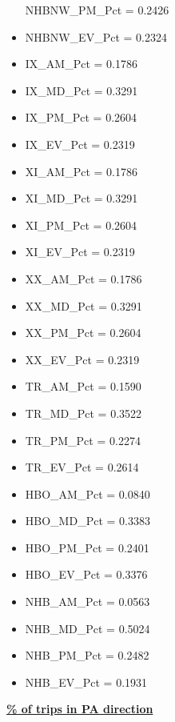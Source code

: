 \documentclass[
  letterpaper,
  DIV=11,
  numbers=noendperiod]{scrreprt}
\begin{document}
\begin{itemize}
  NHBNW\_PM\_Pct = 0.2426
\item
  NHBNW\_EV\_Pct = 0.2324
\item
  IX\_AM\_Pct = 0.1786
\item
  IX\_MD\_Pct = 0.3291
\item
  IX\_PM\_Pct = 0.2604
\item
  IX\_EV\_Pct = 0.2319
\item
  XI\_AM\_Pct = 0.1786
\item
  XI\_MD\_Pct = 0.3291
\item
  XI\_PM\_Pct = 0.2604
\item
  XI\_EV\_Pct = 0.2319
\item
  XX\_AM\_Pct = 0.1786
\item
  XX\_MD\_Pct = 0.3291
\item
  XX\_PM\_Pct = 0.2604
\item
  XX\_EV\_Pct = 0.2319
\item
  TR\_AM\_Pct = 0.1590
\item
  TR\_MD\_Pct = 0.3522
\item
  TR\_PM\_Pct = 0.2274
\item
  TR\_EV\_Pct = 0.2614\\
\item
  HBO\_AM\_Pct = 0.0840
\item
  HBO\_MD\_Pct = 0.3383
\item
  HBO\_PM\_Pct = 0.2401
\item
  HBO\_EV\_Pct = 0.3376
\item
  NHB\_AM\_Pct = 0.0563
\item
  NHB\_MD\_Pct = 0.5024
\item
  NHB\_PM\_Pct = 0.2482
\item
  NHB\_EV\_Pct = 0.1931
\end{itemize}

\textbf{\underline{\% of trips in PA direction}}
\end{document}
